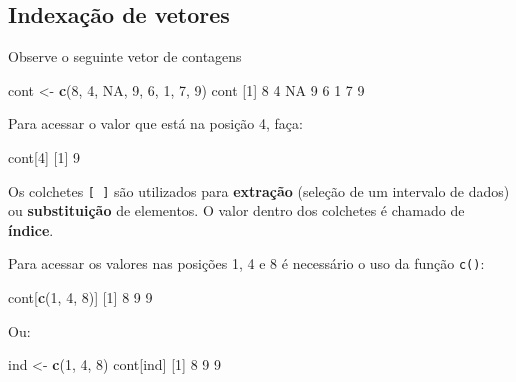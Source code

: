 \documentclass[10pt,a4paper]{book}
\newenvironment{Shaded}{\begin{snugshade}}{\end{snugshade}}
\newcommand{\KeywordTok}[1]{\textcolor[rgb]{0.13,0.29,0.53}{\textbf{#1}}}
\newcommand{\DecValTok}[1]{\textcolor[rgb]{0.00,0.00,0.81}{#1}}
\newcommand{\StringTok}[1]{\textcolor[rgb]{0.31,0.60,0.02}{#1}}
\newcommand{\OtherTok}[1]{\textcolor[rgb]{0.56,0.35,0.01}{#1}}
\newcommand{\NormalTok}[1]{#1}
\begin{document}
\subsection{Indexação de vetores}\label{indexacao-de-vetores}

Observe o seguinte vetor de contagens

\begin{Shaded}
\begin{Highlighting}[]
\NormalTok{cont <-}\StringTok{ }\KeywordTok{c}\NormalTok{(}\DecValTok{8}\NormalTok{, }\DecValTok{4}\NormalTok{, }\OtherTok{NA}\NormalTok{, }\DecValTok{9}\NormalTok{, }\DecValTok{6}\NormalTok{, }\DecValTok{1}\NormalTok{, }\DecValTok{7}\NormalTok{, }\DecValTok{9}\NormalTok{)}
\NormalTok{cont}
\NormalTok{[}\DecValTok{1}\NormalTok{]  }\DecValTok{8}  \DecValTok{4} \OtherTok{NA}  \DecValTok{9}  \DecValTok{6}  \DecValTok{1}  \DecValTok{7}  \DecValTok{9}
\end{Highlighting}
\end{Shaded}

Para acessar o valor que está na posição 4, faça:

\begin{Shaded}
\begin{Highlighting}[]
\NormalTok{cont[}\DecValTok{4}\NormalTok{]}
\NormalTok{[}\DecValTok{1}\NormalTok{] }\DecValTok{9}
\end{Highlighting}
\end{Shaded}

Os colchetes \texttt{{[}\ {]}} são utilizados para \textbf{extração}
(seleção de um intervalo de dados) ou \textbf{substituição} de
elementos. O valor dentro dos colchetes é chamado de \textbf{índice}.

Para acessar os valores nas posições 1, 4 e 8 é necessário o uso da
função \texttt{c()}:

\begin{Shaded}
\begin{Highlighting}[]
\NormalTok{cont[}\KeywordTok{c}\NormalTok{(}\DecValTok{1}\NormalTok{, }\DecValTok{4}\NormalTok{, }\DecValTok{8}\NormalTok{)]}
\NormalTok{[}\DecValTok{1}\NormalTok{] }\DecValTok{8} \DecValTok{9} \DecValTok{9}
\end{Highlighting}
\end{Shaded}

Ou:

\begin{Shaded}
\begin{Highlighting}[]
\NormalTok{ind <-}\StringTok{ }\KeywordTok{c}\NormalTok{(}\DecValTok{1}\NormalTok{, }\DecValTok{4}\NormalTok{, }\DecValTok{8}\NormalTok{)}
\NormalTok{cont[ind]}
\NormalTok{[}\DecValTok{1}\NormalTok{] }\DecValTok{8} \DecValTok{9} \DecValTok{9}
\end{Highlighting}
\end{Shaded}
\end{document}
